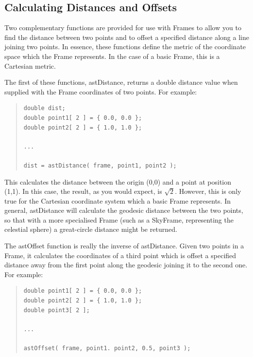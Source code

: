 \documentclass[twoside,11pt]{article}
\newcommand{\htmlref}[2]{#1}
\begin{document}
\subsection{\label{ss:distanceandoffset}Calculating Distances and Offsets}

Two complementary functions are provided for use with Frames to allow
you to find the distance between two points and to offset a specified
distance along a line joining two points. In essence, these functions
define the metric of the coordinate space which the \htmlref{Frame}{Frame}
represents. In the case of a basic Frame, this is a Cartesian metric.

The first of these functions, \htmlref{astDistance}{astDistance}, returns a double distance
value when supplied with the Frame coordinates of two points. For
example:

\begin{quote}
\small
\begin{verbatim}
double dist;
double point1[ 2 ] = { 0.0, 0.0 };
double point2[ 2 ] = { 1.0, 1.0 };

...

dist = astDistance( frame, point1, point2 );
\end{verbatim}
\normalsize
\end{quote}

This calculates the distance between the origin (0,0) and a point at
position (1,1). In this case, the result, as you would expect, is
$\surd{2}$. However, this is only true for the Cartesian coordinate
system which a basic Frame represents. In general, astDistance will
calculate the geodesic distance between the two points, so that with a
more specialised Frame (such as a \htmlref{SkyFrame}{SkyFrame}, representing the celestial
sphere) a great-circle distance might be returned.

The \htmlref{astOffset}{astOffset} function is really the inverse of astDistance. Given two
points in a Frame, it calculates the coordinates of a third point
which is offset a specified distance away from the first point along
the geodesic joining it to the second one. For example:

\begin{quote}
\small
\begin{verbatim}
double point1[ 2 ] = { 0.0, 0.0 };
double point2[ 2 ] = { 1.0, 1.0 };
double point3[ 2 ];

...

astOffset( frame, point1. point2, 0.5, point3 );
\end{verbatim}
\normalsize
\end{quote}
\end{document}
